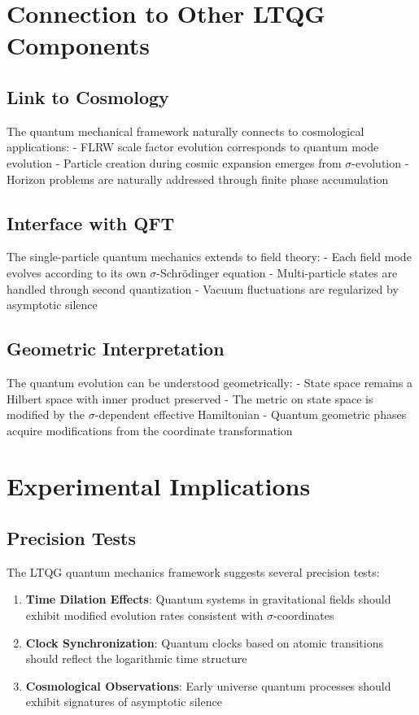 \documentclass[11pt,a4paper]{article}
\begin{document}
\section{Connection to Other LTQG Components}

\subsection{Link to Cosmology}

The quantum mechanical framework naturally connects to cosmological applications:
- FLRW scale factor evolution corresponds to quantum mode evolution
- Particle creation during cosmic expansion emerges from $\sigma$-evolution
- Horizon problems are naturally addressed through finite phase accumulation

\subsection{Interface with QFT}

The single-particle quantum mechanics extends to field theory:
- Each field mode evolves according to its own $\sigma$-Schrödinger equation
- Multi-particle states are handled through second quantization
- Vacuum fluctuations are regularized by asymptotic silence

\subsection{Geometric Interpretation}

The quantum evolution can be understood geometrically:
- State space remains a Hilbert space with inner product preserved
- The metric on state space is modified by the $\sigma$-dependent effective Hamiltonian
- Quantum geometric phases acquire modifications from the coordinate transformation

\section{Experimental Implications}

\subsection{Precision Tests}

The LTQG quantum mechanics framework suggests several precision tests:

\begin{enumerate}
\item \textbf{Time Dilation Effects}: Quantum systems in gravitational fields should exhibit modified evolution rates consistent with $\sigma$-coordinates

\item \textbf{Clock Synchronization}: Quantum clocks based on atomic transitions should reflect the logarithmic time structure

\item \textbf{Cosmological Observations}: Early universe quantum processes should exhibit signatures of asymptotic silence
\end{enumerate}
\end{document}
